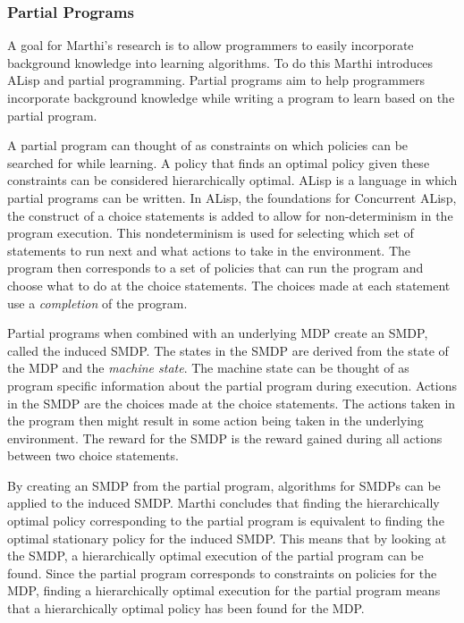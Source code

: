 \documentclass[jair,twoside,11pt,theapa]{article}
\begin{document}
\subsubsection{Partial Programs}
\label{Partial Programs}
A goal for Marthi's research is to allow programmers to easily incorporate background knowledge into learning algorithms. To do this Marthi introduces ALisp \cite{Andre:2002} and partial programming. Partial programs aim to help programmers incorporate background knowledge while writing a program to learn based on the partial program. 

A partial program can thought of as constraints on which policies can be searched for while learning. A policy that finds an optimal policy given these constraints can be considered hierarchically optimal. ALisp is a language in which partial programs can be written. In ALisp, the foundations for Concurrent ALisp, the construct of a choice statements is added to allow for non-determinism in the program execution. This nondeterminism is used for selecting which set of statements to run next and what actions to take in the environment. The program then corresponds to a set of policies that can run the program and choose what to do at the choice statements. The choices made at each statement use a \textit{completion} of the program. 

Partial programs when combined with an underlying MDP create an SMDP, called the induced SMDP. The states in the SMDP are derived from the state of the MDP and the \textit{machine state}. The machine state can be thought of as program specific information about the partial program during execution. Actions in the SMDP are the choices made at the choice statements. The actions taken in the program then might result in some action being taken in the underlying environment. The reward for the SMDP is the reward gained during all actions between two choice statements. 

By creating an SMDP from the partial program, algorithms for SMDPs can be applied to the induced SMDP. Marthi concludes that finding the hierarchically optimal policy corresponding to the partial program is equivalent to finding the optimal stationary policy for the induced SMDP. This means that by looking at the SMDP, a hierarchically optimal execution of the partial program can be found. Since the partial program corresponds to constraints on policies for the MDP, finding a hierarchically optimal execution for the partial program means that a hierarchically optimal policy has been found for the MDP. 
\end{document}
